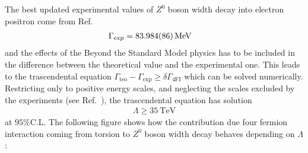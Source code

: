 \documentclass[twocolumn,showpacs,showkeys,prd,superscriptaddress]{revtex4-1}
\begin{document}
The best updated experimental values of $Z^0$ boson width decay into electron positron come from Ref.~\cite{Beringer:1900zz}
\begin{align}
  \label{deltagammaexp}
  \Gamma_{\text{exp}} &= \SI{83.984 \pm 0.086}{\MeV} 
\end{align}
and the effects of the Beyond the Standard Model physics has to be included in the difference between the theoretical value and the experimental one. This leads to the trascendental equation $\Gamma_{\text{teo}} - \Gamma_{\text{exp}}\geq \delta\Gamma_{\text{4FI}}$ which can be solved numerically. Restricting only to positive energy scales, and neglecting the scales excluded by the experiments (see Ref.~\cite{Chatrchyan:2013muj}), the trascendental equation has solution
\begin{eqnarray}
  \Lambda \geq \SI{35}{\TeV}
\end{eqnarray}
at $95\%$C.L. The following figure shows how the contribution due four fermion interaction coming from torsion to $Z^0$ boson width decay behaves depending on $\Lambda$ :
\vspace{0.4cm}
\end{document}

